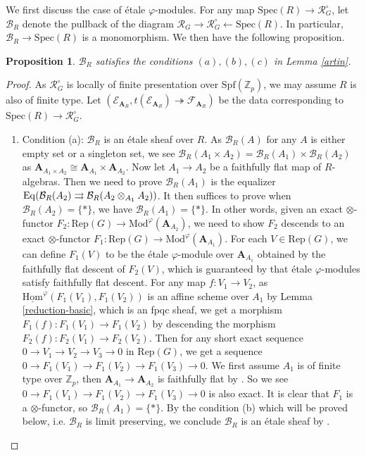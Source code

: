 \documentclass[10pt]{article}
\newtheorem{prop}[thm]{Proposition}
\numberwithin{equation}{section}
\newcommand{\bZ}{{\mathbb Z}}
\newcommand{\calB}{{\mathcal B}}
\newcommand{\calE}{{\mathcal E}}
\newcommand{\calF}{{\mathcal F}}
\newcommand{\calR}{{\mathcal R}}
\newcommand{\Hom}{{\mathrm{Hom}}}           %
\newcommand{\Mod}{{\mathrm{Mod}}}           %
\newcommand{\Rep}{{\mathrm{Rep}}}           %
\newcommand{\Spf}{{\mathrm{Spf}}}           %
\newcommand{\Spec}{{\mathrm{Spec}}}         %
\newcommand{\bfA}{{\textbf{A}}}
\begin{document}
We first discuss the case of \'etale $\varphi$-modules. For any map $\Spec(R)\to \calR_G^{\circ}$, let $\calB_R$ denote the pullback of the diagram $\calR_G\to \calR_G^{\circ}\xleftarrow{} \Spec(R)$. In particular, $\calB_R\to \Spec(R)$ is a monomorphism. We then have the following proposition.
\begin{prop}\label{etale}
   $\calB_R$ satisfies the conditions $(a),(b),(c)$ in Lemma \ref{artin}.
\end{prop}
\begin{proof}
 As $\calR^{\circ}_G$ is locally of finite presentation over $\Spf(\bZ_p)$, we may assume $R$ is also of finite type.  Let $(\calE_{\bfA_R}, t(\calE_{\bfA_R})\twoheadrightarrow \calF_{\bfA_R})$ be the data corresponding to $\Spec(R)\to \calR^{\circ}_G$.

\begin{enumerate}

  \item Condition (a): $\calB_R$ is an \'etale sheaf over $R$. As $\calB_R(A)$ for any $A$ is either empty set or a singleton set, we see $\calB_R(A_1\times A_2)=\calB_R(A_1)\times \calB_R(A_2)$ as $\bfA_{A_1\times A_2}\cong \bfA_{A_1}\times \bfA_{A_2}$. Now let $A_1\to A_2$ be a faithfully flat map of $R$-algebras. Then we need to prove $\calB_R(A_1)$ is the equalizer ${\rm Eq}(\calB_R(A_2)\rightrightarrows \calB_R(A_2\otimes_{A_1}A_2))$. It then suffices to prove when $\calB_R(A_2)=\{*\}$, we have $\calB_R(A_1)=\{*\}$. In other words, given an exact $\otimes$-functor $F_2: \Rep(G)\to \Mod^{\varphi}(\bfA_{A_2})$, we need to show $F_2$ descends to an exact $\otimes$-functor $F_1:\Rep(G)\to \Mod^{\varphi}(\bfA_{A_1})$. For each $V\in \Rep(G)$, we can define $F_1(V)$ to be the \'etale $\varphi$-module over $\bfA_{A_1}$ obtained by the faithfully flat descent of $F_2(V)$, which is guaranteed by that \'etale $\varphi$-modules satisfy faithfully flat descent. For any map $f:V_1\to V_2$, as $\underline\Hom^{\varphi}(F_1(V_1),F_1(V_2))$ is an affine scheme over $A_1$ by Lemma \ref{reduction-basic}, which is an fpqc sheaf, we get a morphism $F_1(f):F_1(V_1)\to F_1(V_2)$ by descending the morphism $F_2(f):F_2(V_1)\to F_2(V_2)$. Then for any short exact sequence $0\to V_1\to V_2\to V_3\to 0$ in $\Rep(G)$, we get a sequence $0\to F_1(V_1)\to F_1(V_2)\to F_1(V_3)\to 0$. We first assume $A_1$ is of finite type over $\bZ_p$, then $\bfA_{A_1}\to \bfA_{A_2}$ is faithfully flat by \cite[Lemma 5.1.7]{EG21}. So we see $0\to F_1(V_1)\to F_1(V_2)\to F_1(V_3)\to 0$ is also exact. It is clear that $F_1$ is a $\otimes$-functor, so $\calB_R(A_1)=\{*\}$. By the condition (b) which will be proved below, i.e. $\calB_R$ is limit preserving, we conclude $\calB_R$ is an \'etale sheaf by \cite[Chapter 2, Proposition 2.2.7]{GR19}.
    

\end{enumerate}
\end{proof}
\end{document}
